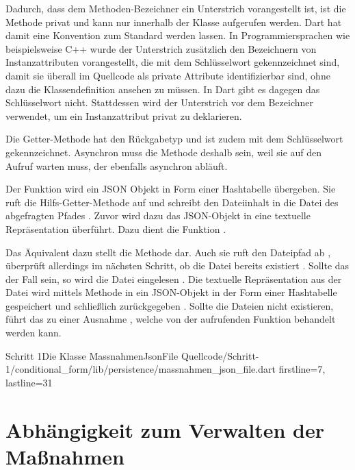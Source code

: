 Dadurch, dass dem Methoden-Bezeichner  ein Unterstrich vorangestellt ist, ist die Methode privat und kann nur innerhalb der Klasse aufgerufen werden.
Dart hat damit eine Konvention zum Standard werden lassen.
In Programmiersprachen wie beispielsweise C++ wurde der Unterstrich zusätzlich den Bezeichnern von Instanzattributen vorangestellt, die mit dem  Schlüsselwort gekennzeichnet sind, damit sie überall im Quellcode als private Attribute identifizierbar sind, ohne dazu die Klassendefinition ansehen zu müssen.
In Dart gibt es dagegen das  Schlüsselwort nicht.
Stattdessen wird der Unterstrich vor dem Bezeichner verwendet, um ein Instanzattribut privat zu deklarieren.

Die Getter-Methode  hat den Rückgabetyp  und ist zudem mit dem Schlüsselwort  gekennzeichnet.
Asynchron muss die Methode deshalb sein, weil sie auf den Aufruf  warten muss, der ebenfalls asynchron abläuft.

Der Funktion   wird ein JSON Objekt in Form einer Hashtabelle übergeben.
Sie ruft die Hilfs-Getter-Methode   auf und schreibt den Dateiinhalt in die Datei des abgefragten Pfades .
Zuvor wird dazu das JSON-Objekt in eine textuelle Repräsentation überführt.
Dazu dient die Funktion .

Das Äquivalent dazu stellt die Methode   dar.
Auch sie ruft den Dateipfad ab , überprüft allerdings im nächsten Schritt, ob die Datei bereits existiert .
Sollte das der Fall sein, so wird die Datei eingelesen .
Die textuelle Repräsentation aus der Datei wird mittels Methode  in ein JSON-Objekt in der Form einer Hashtabelle gespeichert  und schließlich zurückgegeben .
Sollte die Dateien nicht existieren, führt das zu einer Ausnahme , welche von der aufrufenden Funktion behandelt werden kann.

\begin{alexlisting}{Schritt 1}{Die Klasse MassnahmenJsonFile}
  {Quellcode/Schritt-1/conditional_form/lib/persistence/massnahmen_json_file.dart}
  {firstline=7, lastline=31}
  \label{lst:Schritt1KlasseMassnahmenJsonFile}
\end{alexlisting}

\ifIncludeFigures \clearpage \fi
\section{ Abhängigkeit zum Verwalten der Maßnahmen}

